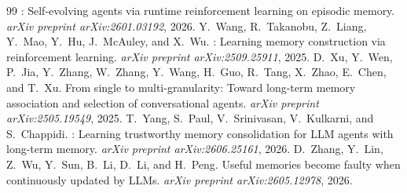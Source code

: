 \documentclass{article}
\begin{document}
\begin{thebibliography}{99}
: Self-evolving agents via runtime reinforcement
learning on episodic memory.
\newblock \emph{arXiv preprint arXiv:2601.03192}, 2026.
Y.~Wang, R.~Takanobu, Z.~Liang, Y.~Mao, Y.~Hu, J.~McAuley, and X.~Wu.
: Learning memory construction via
reinforcement learning.
\newblock \emph{arXiv preprint arXiv:2509.25911}, 2025.
D.~Xu, Y.~Wen, P.~Jia, Y.~Zhang, W.~Zhang, Y.~Wang, H.~Guo, R.~Tang, X.~Zhao, E.~Chen, and T.~Xu.
\newblock From single to multi-granularity: Toward long-term memory
association and selection of conversational agents.
\newblock \emph{arXiv preprint arXiv:2505.19549}, 2025.
T.~Yang, S.~Paul, V.~Srinivasan, V.~Kulkarni, and S.~Chappidi.
: Learning trustworthy memory consolidation for
{LLM} agents with long-term memory.
\newblock \emph{arXiv preprint arXiv:2606.25161}, 2026.
D.~Zhang, Y.~Lin, Z.~Wu, Y.~Sun, B.~Li, D.~Li, and H.~Peng.
\newblock Useful memories become faulty when continuously updated by
{LLMs}.
\newblock \emph{arXiv preprint arXiv:2605.12978}, 2026.
\end{thebibliography}
\end{document}

